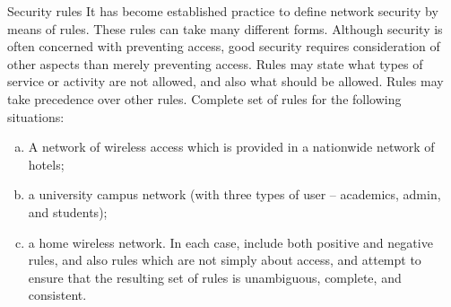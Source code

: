 \begin{exercise}{Security rules}
It has become established practice to define network security by means of
rules. These rules can take many different forms. Although security is often concerned with preventing access, good security requires consideration of other aspects
than merely preventing access. Rules may state what types of service or activity are
not allowed, and also what should be allowed. Rules may take precedence over other
rules.
Complete set of rules for the following situations:
\begin{enumerate}[(a)]
\item A network of wireless access which is provided in a nationwide network of hotels;
\item a university campus network (with three types of user -- academics, admin, and
students);
\item a home wireless network.
In each case, include both positive and negative rules, and also rules which are 
not simply about access, and attempt to ensure that the resulting set of rules is unambiguous,
complete, and consistent.
\end{enumerate}
\end{exercise}

